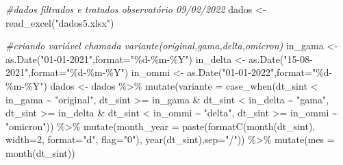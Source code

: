 \documentclass[
]{article}
\newenvironment{Shaded}{\begin{snugshade}}{\end{snugshade}}
\newcommand{\AttributeTok}[1]{\textcolor[rgb]{0.77,0.63,0.00}{#1}}
\newcommand{\CommentTok}[1]{\textcolor[rgb]{0.56,0.35,0.01}{\textit{#1}}}
\newcommand{\DecValTok}[1]{\textcolor[rgb]{0.00,0.00,0.81}{#1}}
\newcommand{\FunctionTok}[1]{\textcolor[rgb]{0.00,0.00,0.00}{#1}}
\newcommand{\NormalTok}[1]{#1}
\newcommand{\OtherTok}[1]{\textcolor[rgb]{0.56,0.35,0.01}{#1}}
\newcommand{\SpecialCharTok}[1]{\textcolor[rgb]{0.00,0.00,0.00}{#1}}
\newcommand{\StringTok}[1]{\textcolor[rgb]{0.31,0.60,0.02}{#1}}
\begin{document}
\begin{Shaded}
\begin{Highlighting}[]
\CommentTok{\#dados filtrados e tratados observatório 09/02/2022}
\NormalTok{dados }\OtherTok{\textless{}{-}} \FunctionTok{read\_excel}\NormalTok{(}\StringTok{"dados5.xlsx"}\NormalTok{)}

\CommentTok{\#criando variável chamada variante(original,gama,delta,omicron)}
\NormalTok{in\_gama }\OtherTok{\textless{}{-}} \FunctionTok{as.Date}\NormalTok{(}\StringTok{"01{-}01{-}2021"}\NormalTok{,}\AttributeTok{format=}\StringTok{"\%d{-}\%m{-}\%Y"}\NormalTok{)}
\NormalTok{in\_delta }\OtherTok{\textless{}{-}} \FunctionTok{as.Date}\NormalTok{(}\StringTok{"15{-}08{-}2021"}\NormalTok{,}\AttributeTok{format=}\StringTok{"\%d{-}\%m{-}\%Y"}\NormalTok{)}
\NormalTok{in\_ommi }\OtherTok{\textless{}{-}} \FunctionTok{as.Date}\NormalTok{(}\StringTok{"01{-}01{-}2022"}\NormalTok{,}\AttributeTok{format=}\StringTok{"\%d{-}\%m{-}\%Y"}\NormalTok{)}
\NormalTok{dados }\OtherTok{\textless{}{-}}\NormalTok{ dados }\SpecialCharTok{\%\textgreater{}\%} 
  \FunctionTok{mutate}\NormalTok{(}\AttributeTok{variante =} \FunctionTok{case\_when}\NormalTok{(dt\_sint }\SpecialCharTok{\textless{}}\NormalTok{ in\_gama }\SpecialCharTok{\textasciitilde{}} \StringTok{"original"}\NormalTok{,}
\NormalTok{                              dt\_sint }\SpecialCharTok{\textgreater{}=}\NormalTok{ in\_gama }\SpecialCharTok{\&}\NormalTok{ dt\_sint }\SpecialCharTok{\textless{}}\NormalTok{ in\_delta }\SpecialCharTok{\textasciitilde{}} \StringTok{"gama"}\NormalTok{,}
\NormalTok{                              dt\_sint }\SpecialCharTok{\textgreater{}=}\NormalTok{ in\_delta }\SpecialCharTok{\&}\NormalTok{ dt\_sint }\SpecialCharTok{\textless{}}\NormalTok{ in\_ommi }\SpecialCharTok{\textasciitilde{}} \StringTok{"delta"}\NormalTok{,}
\NormalTok{                              dt\_sint }\SpecialCharTok{\textgreater{}=}\NormalTok{ in\_ommi }\SpecialCharTok{\textasciitilde{}} \StringTok{"omicron"}\NormalTok{)) }\SpecialCharTok{\%\textgreater{}\%} 
  \FunctionTok{mutate}\NormalTok{(}\AttributeTok{month\_year =} \FunctionTok{paste}\NormalTok{(}\FunctionTok{formatC}\NormalTok{(}\FunctionTok{month}\NormalTok{(dt\_sint), }\AttributeTok{width=}\DecValTok{2}\NormalTok{, }\AttributeTok{format=}\StringTok{"d"}\NormalTok{, }\AttributeTok{flag=}\StringTok{"0"}\NormalTok{),}
                            \FunctionTok{year}\NormalTok{(dt\_sint),}\AttributeTok{sep=}\StringTok{"/"}\NormalTok{)) }\SpecialCharTok{\%\textgreater{}\%} 
  \FunctionTok{mutate}\NormalTok{(}\AttributeTok{mes =} \FunctionTok{month}\NormalTok{(dt\_sint))}
\end{Highlighting}
\end{Shaded}
\end{document}
